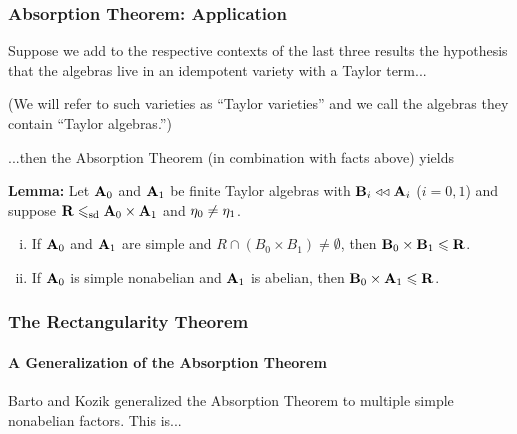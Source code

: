 \documentclass[xcolor=dvipsnames,9pt,hide notes,mathserif]{beamer}
\begin{document}
\begin{frame} \frametitle{Absorption Theorem: Application}
  Suppose we add to the respective contexts of the last three results the hypothesis
  that the algebras live in an idempotent variety with a Taylor term...

  \bigskip  
  (We will refer to such varieties as ``Taylor varieties'' and we call the
  algebras they contain ``Taylor algebras.'')

  \bigskip  
  ...then the Absorption Theorem (in combination with facts above) yields

  \bigskip  
  {\bf Lemma:}
  Let $\mathbf{A}_0$ and $\mathbf{A}_1$ be finite Taylor algebras
  with $\mathbf{B}_i\mathrel{\triangleleft\triangleleft} \mathbf{A}_i$ ($i =0,1$)
  and suppose $\mathbf{R} \leqslant_{\mathrm{sd}} \mathbf{A}_0 \times \mathbf{A}_1$ and $\eta_0 \neq \eta_1$.
    \begin{enumerate}[(i)]
    \item If $\mathbf{A}_0$ and $\mathbf{A}_1$ are simple and $R\cap (B_0 \times B_1) \neq \emptyset$, then
      $\mathbf{B}_0 \times \mathbf{B}_1\leqslant \mathbf{R}$. 
    \item  If $\mathbf{A}_0$ is simple nonabelian and $\mathbf{A}_1$ is abelian,
      then $\mathbf{B}_0 \times \mathbf{A}_1 \leqslant \mathbf{R}$.
    \end{enumerate}

    \bigskip

    \bigskip

    \bigskip
    
\end{frame}


\begin{frame} \frametitle{The Rectangularity Theorem}
  \framesubtitle{A Generalization of the Absorption Theorem}

  Barto and Kozik generalized the Absorption Theorem
  to multiple simple nonabelian factors. This is...
  \bigskip
\end{frame}
\end{document}
